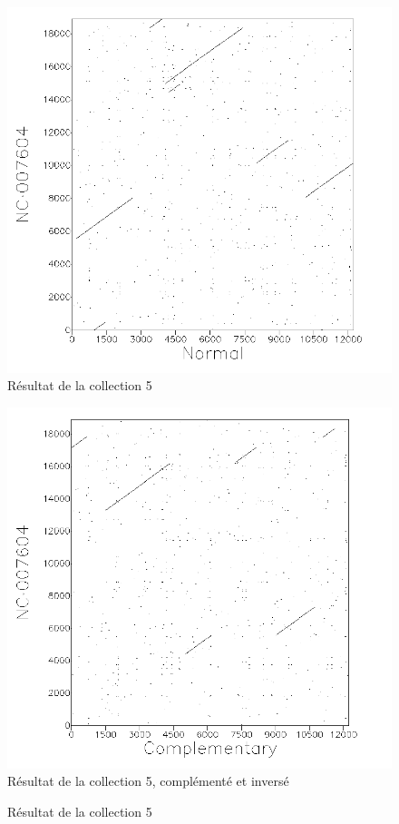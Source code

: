 \begin{figure}[!ht]
	\begin{minipage}[r]{.46\linewidth}
		\begin{center}
		\includegraphics[scale= 0.4]{../res/cible5.png}
		Résultat de la collection 5
	\end{center}
\end{minipage} \hfill
\begin{minipage}[c]{.46 \linewidth}
	\begin{center}
			\includegraphics[scale= 0.4]{../res/cible5-ic.png}
			Résultat de la collection 5, complémenté et inversé
		\end{center}
	\end{minipage}
	\caption{Résultat de la collection 5}
\end{figure}

